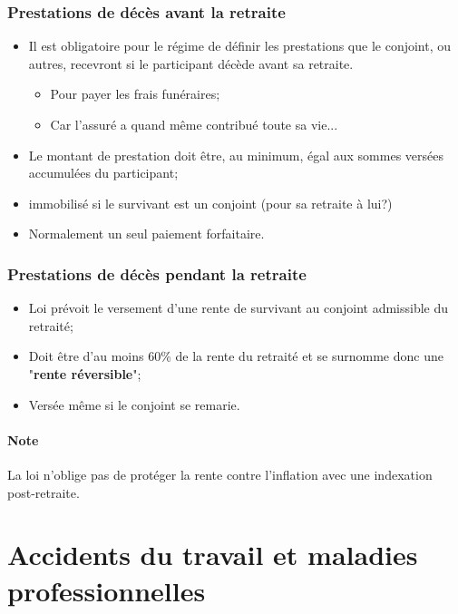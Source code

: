 \documentclass[10pt, french]{article}
\begin{document}
\begin{multicols*}{3}
\subsubsection*{Prestations de décès avant la retraite}
\begin{itemize}[leftmargin = *]
	\item	Il est obligatoire pour le régime de définir les prestations que le conjoint, ou autres, recevront si le participant décède avant sa retraite.
	\begin{itemize}
	\item	Pour payer les frais funéraires;
	\item 	Car l'assuré a quand même contribué toute sa vie...
	\end{itemize}
	\item	Le montant de prestation doit être, au minimum, égal aux sommes versées accumulées du participant;
	\item	immobilisé si le survivant est un conjoint (pour sa retraite à lui?)
	\item	Normalement un seul paiement forfaitaire.
\end{itemize}

\subsubsection*{Prestations de décès pendant la retraite}
\begin{itemize}[leftmargin = *]
	\item	Loi prévoit le versement d'une rente de survivant au conjoint admissible du retraité;
	\item	Doit être d'au moins 60\% de la rente du retraité et se surnomme donc une "\textbf{rente réversible}";
	\item	Versée même si le conjoint se remarie.
\end{itemize}

\paragraph{Note}	La loi n'oblige pas de protéger la rente contre l'inflation avec une indexation post-retraite.


\newpage

\section{Accidents du travail et maladies professionnelles}


\end{multicols*}
\end{document}
